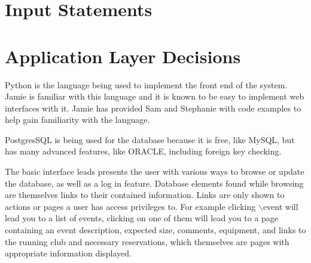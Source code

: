 \documentclass{article}
\begin{document}
\begin{comment}
\item SELECT COUNT(*) AS c, semail FROM reservation NATURAL JOIN student GROUP BY semail ORDER BY COUNT(*) DESC LIMIT 10
\item SELECT cemail FROM memberof WHERE semail=\%(email)s
\item SELECT data FROM sessions WHERE id=\%(id)s
\item SELECT email, aemail, super, semail, cemail FROM users LEFT OUTER JOIN
admin ON email = aEmail LEFT OUTER JOIN student ON email = sEmail LEFT OUTER
JOIN club ON email = cEmail WHERE email = \%(email)s
\item SELECT equipname FROM isIn WHERE roomnum=\%(room)s AND building=\%(building)s ORDER BY equipname
\item SELECT equipname FROM uses WHERE EID=\%(id)i ORDER BY equipname
\item SELECT major, COUNT(rid) AS count FROM ( (SELECT rid, major1 AS major FROM reservation NATURAL JOIN student) UNION (SELECT rid, major2 AS major FROM reservation NATURAL JOIN student WHERE major2 IS NOT NULL) ) AS counts GROUP BY major ORDER BY count DESC LIMIT 10
\item UPDATE sessions SET data=\%(data)s WHERE id=\%(id)s
\end{itemize}
\end{comment}


\section{Input Statements}


\section{Application Layer Decisions}
Python is the language being used to implement the front end of the system. Jamie is familiar with this language
and it is known to be easy to implement web interfaces with it. Jamie has provided Sam and Stephanie with code examples
to help gain familiarity with the language.

PostgresSQL is being used for the database because it is free, like MySQL, but has many advanced features, like ORACLE,
including foreign key checking.

The basic interface leads presents the user with various ways to browse or update the database, as well as a log in feature.
Database elements found while browsing are themselves links to their contained information.
Links are only shown to actions or pages a user has access privileges to.
For example clicking $\backslash$event will lead you to a list of events, clicking on one of them will lead you to a page containing
an event description, expected size, comments, equipment, and links to the running club and necessary reservations,
which themselves are pages with appropriate information displayed.
\end{document}
